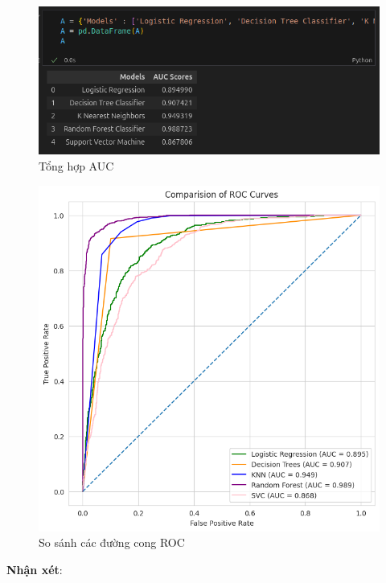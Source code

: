 \documentclass[11pt]{article}
\begin{document}
	\begin{figure}[H]
		\centering
		\includegraphics[width=0.7\linewidth]{screenshot012}
		\caption{Tổng hợp AUC}
		\label{fig:screenshot012}
	\end{figure}
	
	\begin{figure}[H]
		\centering
		\includegraphics[width=0.7\linewidth]{compareAUC}
		\caption{So sánh các đường cong ROC}
		\label{fig:compareauc}
	\end{figure}
	
	\textbf{Nhận xét}:
	\vspace{0.2cm}
	
\end{document}
